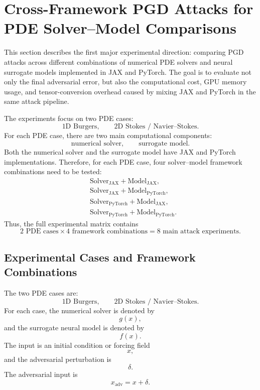 \documentclass{article}
\begin{document}
\section{Cross-Framework PGD Attacks for PDE Solver--Model Comparisons}

This section describes the first major experimental direction: comparing PGD attacks across different combinations of numerical PDE solvers and neural surrogate models implemented in JAX and PyTorch. The goal is to evaluate not only the final adversarial error, but also the computational cost, GPU memory usage, and tensor-conversion overhead caused by mixing JAX and PyTorch in the same attack pipeline.

The experiments focus on two PDE cases:
\[
\text{1D Burgers},
\qquad
\text{2D Stokes / Navier--Stokes}.
\]
For each PDE case, there are two main computational components:
\[
\text{numerical solver},
\qquad
\text{surrogate model}.
\]
Both the numerical solver and the surrogate model have JAX and PyTorch implementations. Therefore, for each PDE case, four solver--model framework combinations need to be tested:
\[
\begin{aligned}
&\text{Solver}_{\mathrm{JAX}} + \text{Model}_{\mathrm{JAX}},\\
&\text{Solver}_{\mathrm{JAX}} + \text{Model}_{\mathrm{PyTorch}},\\
&\text{Solver}_{\mathrm{PyTorch}} + \text{Model}_{\mathrm{JAX}},\\
&\text{Solver}_{\mathrm{PyTorch}} + \text{Model}_{\mathrm{PyTorch}}.
\end{aligned}
\]
Thus, the full experimental matrix contains
\[
2 \text{ PDE cases} \times 4 \text{ framework combinations}
=
8 \text{ main attack experiments}.
\]

\subsection{Experimental Cases and Framework Combinations}

The two PDE cases are:
\[
\text{1D Burgers},
\qquad
\text{2D Stokes / Navier--Stokes}.
\]
For each case, the numerical solver is denoted by
\[
g(x),
\]
and the surrogate neural model is denoted by
\[
f(x).
\]
The input is an initial condition or forcing field
\[
x,
\]
and the adversarial perturbation is
\[
\delta.
\]
The adversarial input is
\[
x_{\mathrm{adv}} = x+\delta.
\]
\end{document}
